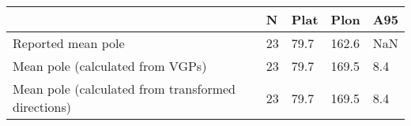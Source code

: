 \begin{tabular}{lllll}
\toprule
{} &   N &  Plat &   Plon &  A95 \\
\midrule
Reported mean pole                                 &  23 &  79.7 &  162.6 &  NaN \\
Mean pole (calculated from VGPs)                   &  23 &  79.7 &  169.5 &  8.4 \\
Mean pole (calculated from transformed directions) &  23 &  79.7 &  169.5 &  8.4 \\
\bottomrule
\end{tabular}
